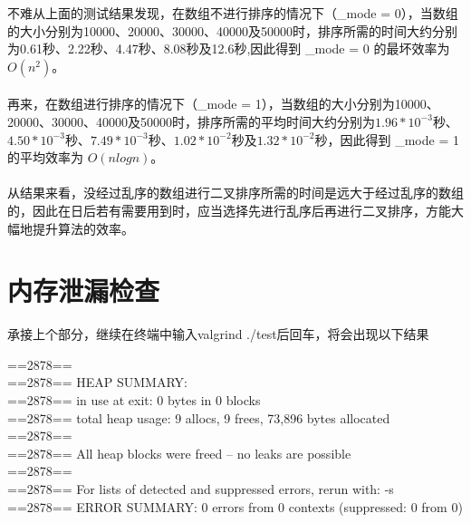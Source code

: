 \documentclass[UTF8]{ctexart}
\begin{document}
不难从上面的测试结果发现，在数组不进行排序的情况下（\_mode = 0），当数组的大小分别为10000、20000、30000、40000及50000时，排序所需的时间大约分别为0.61秒、2.22秒、4.47秒、8.08秒及12.6秒,因此得到 \_mode = 0 的最坏效率为 $O(n^2)$。\\

\\再来，在数组进行排序的情况下（\_mode = 1），当数组的大小分别为10000、20000、30000、40000及50000时，排序所需的平均时间大约分别为$1.96*10^{-3}$秒、$4.50*10^{-3}$秒、$7.49*10^{-3}$秒、$1.02*10^{-2}$秒及$1.32*10^{-2}$秒，因此得到 \_mode = 1 的平均效率为 $O(nlogn)$。\\

\\从结果来看，没经过乱序的数组进行二叉排序所需的时间是远大于经过乱序的数组的，因此在日后若有需要用到时，应当选择先进行乱序后再进行二叉排序，方能大幅地提升算法的效率。
\newpage

\section{内存泄漏检查}

承接上个部分，继续在终端中输入valgrind ./test后回车，将会出现以下结果

\begin{flushleft}
==2878== \\
==2878== HEAP SUMMARY: \\
==2878==     in use at exit: 0 bytes in 0 blocks \\
==2878==   total heap usage: 9 allocs, 9 frees, 73,896 bytes allocated \\
==2878== \\
==2878== All heap blocks were freed -- no leaks are possible \\
==2878== \\
==2878== For lists of detected and suppressed errors, rerun with: -s \\
==2878== ERROR SUMMARY: 0 errors from 0 contexts (suppressed: 0 from 0) \\
\end{flushleft}
\end{document}
